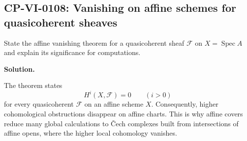 
\subsection*{CP-VI-0108: Vanishing on affine schemes for quasicoherent sheaves}

State the affine vanishing theorem for a quasicoherent sheaf $\mathcal F$ on $X=\operatorname{Spec}A$ and explain its significance for computations.

\medskip
\noindent\textbf{Solution.}

The theorem states
\[
H^i(X,\mathcal F)=0\qquad(i>0)
\]
for every quasicoherent $\mathcal F$ on an affine scheme $X$. Consequently, higher cohomological obstructions disappear on affine charts. This is why affine covers reduce many global calculations to Čech complexes built from intersections of affine opens, where the higher local cohomology vanishes.
